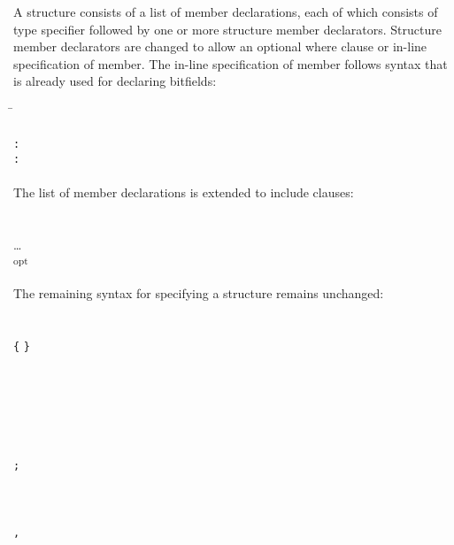 A structure consists of a list of member declarations, each of which
consists of type specifier followed by one or more structure member
declarators. Structure member declarators are changed to allow an
optional where clause or in-line specification of member. The in-line
specification of member follows syntax that is already used for
declaring bitfields:

\begin{tabbing}
\=\\
\>  \\
\>  \texttt{:}
    \\
\>  \texttt{:} 
 \\
\\
The list of member declarations is extended to include 
clauses:\\
\\
\\
\> \ldots{} \\
\> \textsubscript{opt}  \\
\\
The remaining syntax for specifying a structure remains unchanged: \\
\\
\\
\>  \texttt{\{}
 \texttt{\}} \\
\\
 \\
\>  \\
\>  \\
\\
 \\
\>  \texttt{;} \\
\\
 \\
\>  \\
\>  \texttt{,}  
\end{tabbing}


